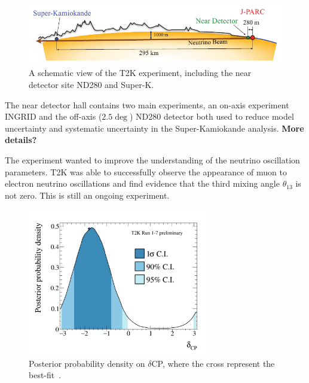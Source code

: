 \begin{figure}[h!]
\centering
  \centering
\includegraphics[width=\textwidth]{figures/T2KBeam.png}
\vspace{2mm}
\caption{A schematic view of the T2K experiment, including the near detector site ND280 and Super-K.}
\label{fig:T2K}
\end{figure}

The near detector hall contains two main experiments, an on-axis experiment INGRID and the off-axis ($2.5\deg$) ND280 detector both used to reduce model uncertainty and systematic uncertainty in the Super-Kamiokande analysis. \textbf{More details?}

The experiment wanted to improve the understanding of the neutrino oscillation parameters. T2K was able to successfully observe the appearance of muon to electron neutrino oscillations and find evidence that the third mixing angle $\theta_{13}$ is not zero. This is still an ongoing experiment. 

\begin{figure}[h!]
\centering
  \centering
\includegraphics[width=0.7\textwidth]{figures/t2k1.jpeg}
\vspace{2mm}
\caption{Posterior probability density on $\delta$CP, where the cross represent the best-fit~\cite{T2Kfigures}.}
\label{fig:T2KCP}
\end{figure}

